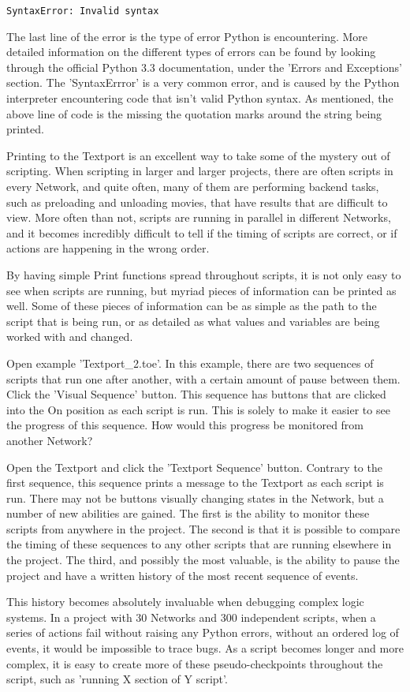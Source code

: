 \begin{fullwidth}
\begin{lstlisting}
SyntaxError: Invalid syntax
\end{lstlisting}

The last line of the error is the type of error Python is encountering. More detailed information on the different types of errors can be found by looking through the official Python 3.3 documentation, under the 'Errors and Exceptions' section. The 'SyntaxErrror' is a very common error, and is caused by the Python interpreter encountering code that isn't valid Python syntax. As mentioned, the above line of code is the missing the quotation marks around the string being printed.

Printing to the Textport is an excellent way to take some of the mystery out of scripting. When scripting in larger and larger projects, there are often scripts in every Network, and quite often, many of them are performing backend tasks, such as preloading and unloading movies, that have results that are difficult to view. More often than not, scripts are running in parallel in different Networks, and it becomes incredibly difficult to tell if the timing of scripts are correct, or if actions are happening in the wrong order.

By having simple Print functions spread throughout scripts, it is not only easy to see when scripts are running, but myriad pieces of information can be printed as well. Some of these pieces of information can be as simple as the path to the script that is being run, or as detailed as what values and variables are being worked with and changed.

Open example 'Textport\_2.toe'. In this example, there are two sequences of scripts that run one after another, with a certain amount of pause between them. Click the 'Visual Sequence' button. This sequence has buttons that are clicked into the On position as each script is run. This is solely to make it easier to see the progress of this sequence. How would this progress be monitored from another Network?

Open the Textport and click the 'Textport Sequence' button. Contrary to the first sequence, this sequence prints a message to the Textport as each script is run. There may not be buttons visually changing states in the Network, but a number of new abilities are gained. The first is the ability to monitor these scripts from anywhere in the project. The second is that it is possible to compare the timing of these sequences to any other scripts that are running elsewhere in the project. The third, and possibly the most valuable, is the ability to pause the project and have a written history of the most recent sequence of events.

This history becomes absolutely invaluable when debugging complex logic systems. In a project with 30 Networks and 300 independent scripts, when a series of actions fail without raising any Python errors, without an ordered log of events, it would be impossible to trace bugs. As a script becomes longer and more complex, it is easy to create more of these pseudo-checkpoints throughout the script, such as 'running X section of Y script'.

\end{fullwidth}

